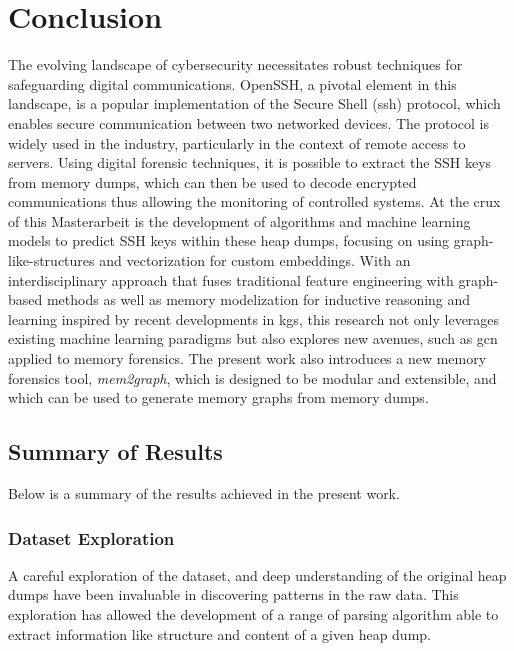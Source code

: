 \chapter{Conclusion}\label{chap:conclusion}


The evolving landscape of cybersecurity necessitates robust techniques for safeguarding digital communications. OpenSSH, a pivotal element in this landscape, is a popular implementation of the Secure Shell (\acrshort{ssh}) protocol, which enables secure communication between two networked devices. The protocol is widely used in the industry, particularly in the context of remote access to servers. Using digital forensic techniques, it is possible to extract the SSH keys from memory dumps, which can then be used to decode encrypted communications thus allowing the monitoring of controlled systems. At the crux of this Masterarbeit is the development of algorithms and machine learning models to predict SSH keys within these heap dumps, focusing on using graph-like-structures and vectorization for custom embeddings. With an interdisciplinary approach that fuses traditional feature engineering with graph-based methods as well as memory modelization for inductive reasoning and learning inspired by recent developments in \acrfull{kg}s, this research not only leverages existing machine learning paradigms but also explores new avenues, such as \acrfull{gcn} applied to memory forensics. The present work also introduces a new memory forensics tool, \textit{mem2graph}, which is designed to be modular and extensible, and which can be used to generate memory graphs from memory dumps. 

\section{Summary of Results}
Below is a summary of the results achieved in the present work.

\subsection{Dataset Exploration}
A careful exploration of the dataset, and deep understanding of the original heap dumps have been invaluable in discovering patterns in the raw data. This exploration has allowed the development of a range of parsing algorithm able to extract information like structure and content of a given heap dump.

